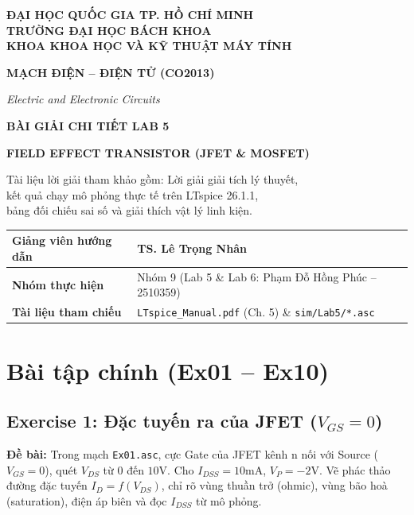 \documentclass[11pt,a4paper]{article}
\newcommand{\cmd}[1]{\texttt{#1}}
\begin{document}
\begin{titlepage}
\centering
\vspace*{1.5cm}
{\sffamily\bfseries\large ĐẠI HỌC QUỐC GIA TP. HỒ CHÍ MINH\\
TRƯỜNG ĐẠI HỌC BÁCH KHOA\\
KHOA KHOA HỌC VÀ KỸ THUẬT MÁY TÍNH\par}
\vspace{1.8cm}
{\sffamily\bfseries\Large\color{navy} MẠCH ĐIỆN -- ĐIỆN TỬ (CO2013)\par}
{\itshape\color{navy} Electric and Electronic Circuits\par}
\vspace{1.6cm}
{\sffamily\bfseries\Huge\color{navy} BÀI GIẢI CHI TIẾT LAB 5\par}
\vspace{0.4cm}
{\sffamily\bfseries\Large\color{accent} FIELD EFFECT TRANSISTOR (JFET \& MOSFET)\par}
\vspace{1.2cm}
{\normalsize Tài liệu lời giải tham khảo gồm: Lời giải giải tích lý thuyết,\\
kết quả chạy mô phỏng thực tế trên LTspice 26.1.1,\\
bảng đối chiếu sai số và giải thích vật lý linh kiện.\par}
\vfill
\renewcommand{\arraystretch}{1.4}
\begin{tabular}{|>{\bfseries\sffamily}p{4.5cm}|p{8.5cm}|}
\hline
Giảng viên hướng dẫn & TS. Lê Trọng Nhân \\ \hline
Nhóm thực hiện & Nhóm 9 (Lab 5 \& Lab 6: Phạm Đỗ Hồng Phúc -- 2510359) \\ \hline
Tài liệu tham chiếu & \cmd{LTspice\_Manual.pdf} (Ch. 5) \& \cmd{sim/Lab5/*.asc} \\ \hline
\end{tabular}
\vspace{1cm}
\end{titlepage}

\tableofcontents
\newpage

\section{Bài tập chính (Ex01 -- Ex10)}

\subsection{Exercise 1: Đặc tuyến ra của JFET (\texorpdfstring{$V_{GS}=0$}{VGS = 0})}
\textbf{Đề bài:} Trong mạch \cmd{Ex01.asc}, cực Gate của JFET kênh n nối với Source ($V_{GS}=0$), quét $V_{DS}$ từ $0$ đến $10\text{V}$. Cho $I_{DSS}=10\text{mA}$, $V_P=-2\text{V}$. Vẽ phác thảo đường đặc tuyến $I_D=f(V_{DS})$, chỉ rõ vùng thuần trở (ohmic), vùng bão hoà (saturation), điện áp biên và đọc $I_{DSS}$ từ mô phỏng.
\end{document}
